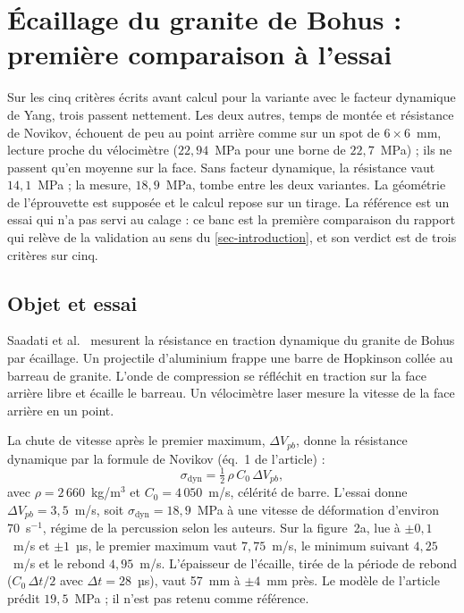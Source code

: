 \section{Écaillage du granite de Bohus : première comparaison à l'essai}
\label{sec-ecaillage}

Sur les cinq critères écrits avant calcul pour la variante avec le facteur dynamique de Yang, trois passent nettement. Les deux autres, temps de montée et résistance de Novikov, échouent de peu au point arrière comme sur un spot de $6 \times 6$~mm, lecture proche du vélocimètre ($22{,}94$~MPa pour une borne de $22{,}7$~MPa) ; ils ne passent qu'en moyenne sur la face. Sans facteur dynamique, la résistance vaut $14{,}1$~MPa ; la mesure, $18{,}9$~MPa, tombe entre les deux variantes. La géométrie de l'éprouvette est supposée et le calcul repose sur un tirage. La référence est un essai qui n'a pas servi au calage : ce banc est la première comparaison du rapport qui relève de la validation au sens du \cref{sec-introduction}, et son verdict est de trois critères sur cinq.

\subsection{Objet et essai}

Saadati et al.~\cite{saadati2016spall} mesurent la résistance en traction dynamique du granite de Bohus par écaillage. Un projectile d'aluminium frappe une barre de Hopkinson collée au barreau de granite. L'onde de compression se réfléchit en traction sur la face arrière libre et écaille le barreau. Un vélocimètre laser mesure la vitesse de la face arrière en un point.

La chute de vitesse après le premier maximum, $\Delta V_{pb}$, donne la résistance dynamique par la formule de Novikov (éq.~1 de l'article) :
\begin{equation}
\sigma_\text{dyn} = \tfrac12\,\rho\,C_0\,\Delta V_{pb} ,
\label{eq-novikov}
\end{equation}
avec $\rho = 2\,660$~kg/m$^3$ et $C_0 = 4\,050$~m/s, célérité de barre. L'essai donne $\Delta V_{pb} = 3{,}5$~m/s, soit $\sigma_\text{dyn} = 18{,}9$~MPa à une vitesse de déformation d'environ 70~s$^{-1}$, régime de la percussion selon les auteurs. Sur la figure~2a, lue à $\pm 0{,}1$~m/s et $\pm 1$~µs, le premier maximum vaut $7{,}75$~m/s, le minimum suivant $4{,}25$~m/s et le rebond $4{,}95$~m/s. L'épaisseur de l'écaille, tirée de la période de rebond ($C_0\,\Delta t/2$ avec $\Delta t = 28$~µs), vaut 57~mm à $\pm 4$~mm près. Le modèle de l'article prédit $19{,}5$~MPa ; il n'est pas retenu comme référence.

